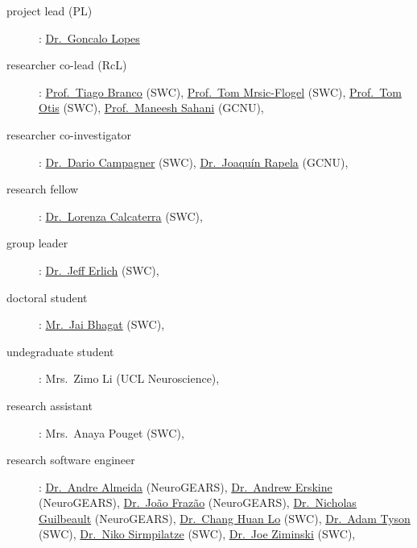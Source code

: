 
\begin{description}
    \item[project lead (PL)]:
    \href{https://neurogears.org/about-us/}{Dr.~Goncalo Lopes}

    \item[researcher co-lead (RcL)]:
        \href{https://www.sainsburywellcome.org/web/people/tiago-branco}{Prof.~Tiago Branco} (SWC),
        \href{https://www.sainsburywellcome.org/web/people/tom-mrsic-flogel}{Prof.~Tom Mrsic-Flogel} (SWC), 
        \href{https://www.sainsburywellcome.org/web/people/tom-otis}{Prof.~Tom Otis} (SWC), 
        \href{https://www.gatsby.ucl.ac.uk/~maneesh/}{Prof.~Maneesh Sahani} (GCNU), 

    \item[researcher co-investigator]:
        \href{https://www.sainsburywellcome.org/web/people/dario-campagner}{Dr.~Dario Campagner} (SWC),
        \href{http://www.gatsby.ucl.ac.uk/~rapela/index.html}{Dr.~Joaqu\'{i}n Rapela} (GCNU),

    \item[research fellow]:
        \href{https://www.sainsburywellcome.org/web/people/lorenza-calcaterra-0}{Dr.~Lorenza Calcaterra} (SWC),

    \item[group leader]:
        \href{https://www.sainsburywellcome.org/web/people/jeffrey-erlich}{Dr.~Jeff Erlich} (SWC),

    \item[doctoral student]:
        \href{https://www.sainsburywellcome.org/web/people/jai-bhagat}{Mr.~Jai Bhagat} (SWC),

    \item[undegraduate student]:
        Mrs.~Zimo Li (UCL Neuroscience),

    \item[research assistant]:
        Mrs.~Anaya Pouget (SWC),

    \item[research software engineer]:
        \href{https://neurogears.org/about-us/}{Dr.~Andre Almeida} (NeuroGEARS), 
        \href{https://neurogears.org/about-us/}{Dr.~Andrew Erskine} (NeuroGEARS), 
        \href{https://neurogears.org/about-us/}{Dr.~Jo\~{a}o Fraz\~{a}o} (NeuroGEARS), 
        \href{https://neurogears.org/about-us/}{Dr.~Nicholas Guilbeault} (NeuroGEARS), 
        \href{https://www.sainsburywellcome.org/web/people/chang-huan-lo}{Dr.~Chang Huan Lo} (SWC), 
        \href{https://www.sainsburywellcome.org/web/people/adam-tyson-0}{Dr.~Adam Tyson} (SWC), 
        \href{https://www.sainsburywellcome.org/web/people/niko-sirmpilatze}{Dr.~Niko Sirmpilatze} (SWC), 
        \href{https://www.sainsburywellcome.org/web/people/joe-ziminski}{Dr.~Joe Ziminski} (SWC), 


\end{description}
